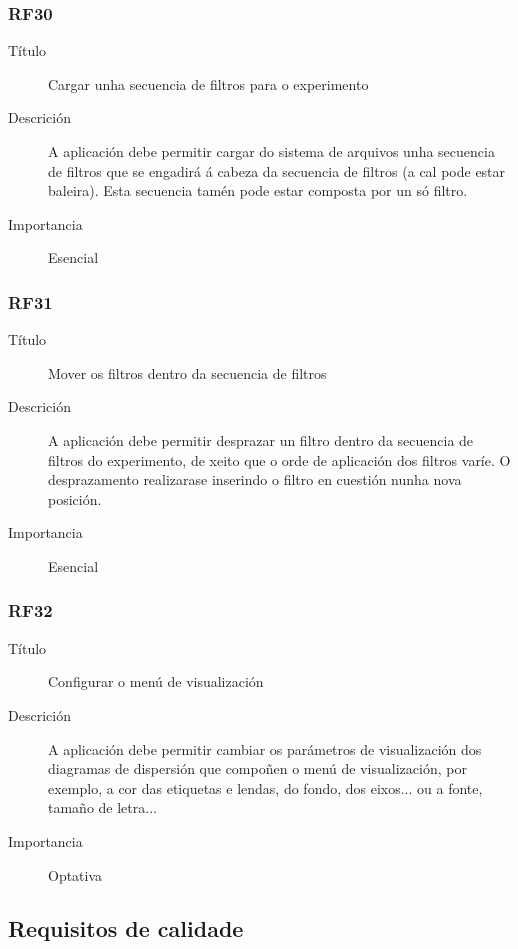 \subsubsection*{RF30}
\begin{description}
\item[Título] \hfill
Cargar unha secuencia de filtros para o experimento
\item[Descrición] \hfill
A aplicación debe permitir cargar do sistema de arquivos unha secuencia de filtros que se engadirá á cabeza da secuencia de filtros (a cal pode estar baleira). Esta secuencia tamén pode estar composta por un só filtro.
\item[Importancia] \hfill
Esencial
\end{description}

\subsubsection*{RF31}
\begin{description}
\item[Título] \hfill
Mover os filtros dentro da secuencia de filtros
\item[Descrición] \hfill
A aplicación debe permitir desprazar un filtro dentro da secuencia de filtros do experimento, de xeito que o orde de aplicación dos filtros varíe. O desprazamento realizarase inserindo o filtro en cuestión nunha nova posición.
\item[Importancia] \hfill
Esencial
\end{description}

\subsubsection*{RF32}
\begin{description}
\item[Título] \hfill
Configurar o menú de visualización
\item[Descrición] \hfill
A aplicación debe permitir cambiar os parámetros de visualización dos diagramas de dispersión que compoñen o menú de visualización, por exemplo, a cor das etiquetas e lendas, do fondo, dos eixos... ou a fonte, tamaño de letra...
\item[Importancia] \hfill
Optativa
\end{description}

\subsection{Requisitos de calidade}

